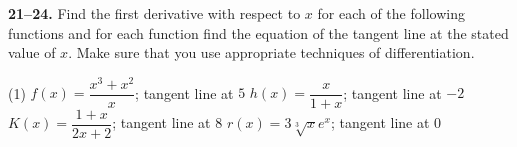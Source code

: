 \documentclass[10pt,oneside,]{book}
\theoremstyle{plain}
\theoremstyle{definition}
\numberwithin{equation}{section}
\newcommand{\fe}[2]{#1\mathopen{}\left(#2\right)\mathclose{}}
\begin{document}
\par\smallskip\noindent
\textbf{21--24. }\hypertarget{exercisegroup-88}{\null}Find the first derivative with respect to \(x\) for each of the following functions and for each function find the equation of the tangent line at the stated value of \(x\).  Make sure that you use appropriate techniques of differentiation.%
\par
\begin{exercisegroup}(1)
\exercise[21.]\hypertarget{exercise-422}{\null}\(\fe{f}{x}=\dfrac{x^3+x^2}{x}\); tangent line at \(5\)%
\exercise[22.]\hypertarget{exercise-423}{\null}\(\fe{h}{x}=\dfrac{x}{1+x}\); tangent line at \(-2\)%
\exercise[23.]\hypertarget{exercise-424}{\null}\(\fe{K}{x}=\dfrac{1+x}{2x+2}\); tangent line at \(8\)%
\exercise[24.]\hypertarget{exercise-425}{\null}\(\fe{r}{x}=3\sqrt[3]{x}e^x\); tangent line at \(0\)%
\end{exercisegroup}
\par\smallskip\noindent
\end{document}
